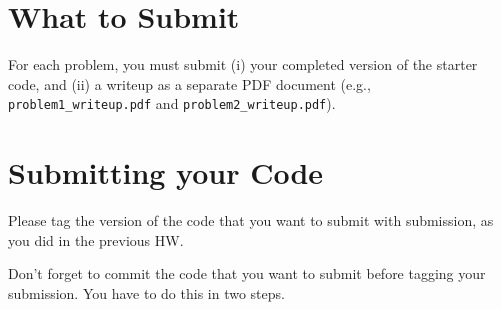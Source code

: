 \documentclass[10pt]{article}
\begin{document}
\section{What to Submit}
For each problem, you must submit (i) your completed version of the starter code, and (ii) a writeup as a separate PDF document (e.g., {\tt problem1\_writeup.pdf} and {\tt problem2\_writeup.pdf}).


\section{Submitting your Code}
Please tag the version of the code that you want to submit with submission, as you did in the previous HW.

Don't forget to commit the code that you want to submit before tagging your submission. You have to do this in two steps.
\end{document}
